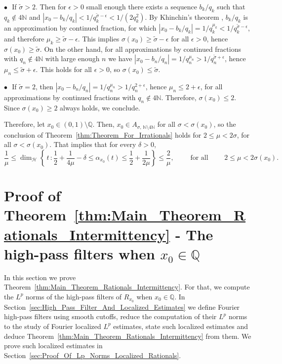 \documentclass[11pt,reqno]{amsart}
\theoremstyle{definition}
\begin{document}
$\bullet\, \, $ If $\widetilde\sigma > 2$. 
Then for $\epsilon > 0$ small enough there exists a sequence $b_k/q_k$ such that $q_k \not\in 4\mathbb N$ and $|x_0 -  b_k/q_k| < 1/q_k^{\widetilde\sigma - \epsilon} < 1/(2q_k^2)$. 
By Khinchin's theorem \cite[Theorem 19]{Khinchin1964}, $b_k/q_k$ is an approximation by continued fraction, for which $|x_0 -  b_k/q_k| = 1/q_k^{\mu_k} < 1/q_k^{\widetilde\sigma - \epsilon}$,
 and therefore $\mu_k \geq \widetilde\sigma - \epsilon$. 
This implies $\sigma(x_0) \geq \widetilde\sigma - \epsilon $ for all $\epsilon > 0$, hence $ \sigma(x_0) \geq \widetilde\sigma$.
On the other hand, 
for all approximations by continued fractions with $q_n \not\in 4\mathbb N$ with large enough $n$
we have
$|x_0 -  b_n/q_n| = 1/q_n^{\mu_n} > 1/q_n^{\widetilde\sigma + \epsilon}$, hence $\mu_n  \leq \widetilde\sigma + \epsilon$. 
This holds for all $\epsilon > 0$, so $\sigma(x_0) \leq \widetilde\sigma$. 

$\bullet\, \, $  If $\widetilde\sigma = 2$, then  $|x_0 -  b_n/q_n| = 1/q_n^{\mu_n} > 1/q_n^{2 + \epsilon}$, hence $\mu_n \leq 2+\epsilon$, for all approximations by continued fractions with $q_n \not\in 4\mathbb N$.
Therefore, $\sigma(x_0) \leq 2$. Since $\sigma(x_0) \geq 2$ always holds, we conclude. 

Therefore, 
let $x_0 \in (0,1) \setminus \mathbb Q$. 
Then, $x_0 \in A_{\sigma,  \, \mathbb N \setminus 4\mathbb N}$ for all $\sigma < \sigma(x_0)$, 
so the conclusion of Theorem~\ref{thm:Theorem_For_Irrationals}
holds for $2 \leq \mu < 2\sigma$, for all $\sigma < \sigma(x_0)$. 
That implies that for every $\delta > 0$, 
\[
\frac{1}{\mu} \leq \operatorname{dim}_{\mathcal H} \left\{   \, t \, : \frac12 + \frac{1}{4\mu} - \delta  \leq \alpha_{x_0}(t) \leq \frac12 + \frac{1}{2\mu}    \right\}  \leq \frac{2}{\mu}, \qquad \text{ for all } \qquad 2 \leq \mu < 2\sigma(x_0). 
\]







\section{Proof of Theorem~\ref{thm:Main_Theorem_Rationals_Intermittency} - The high-pass filters when $x_0 \in \mathbb Q$}
\label{sec:Rational_High_Pass_Filters}
In this section we prove Theorem~\ref{thm:Main_Theorem_Rationals_Intermittency}. 
For that,  we compute the $L^p$ norms of the high-pass filters of $R_{x_0}$
when $x_0 \in \mathbb Q$. 
In Section~\ref{sec:High_Pass_Filter_And_Localized_Estimates}
we define Fourier high-pass filters using smooth cutoffs, 
reduce the computation of their $L^p$ norms to the study of Fourier localized $L^p$ estimates, 
state such localized estimates and deduce Theorem~\ref{thm:Main_Theorem_Rationals_Intermittency} from them.  
We prove such localized estimates in Section~\ref{sec:Proof_Of_Lp_Norms_Localized_Rationals}.
\end{document}

